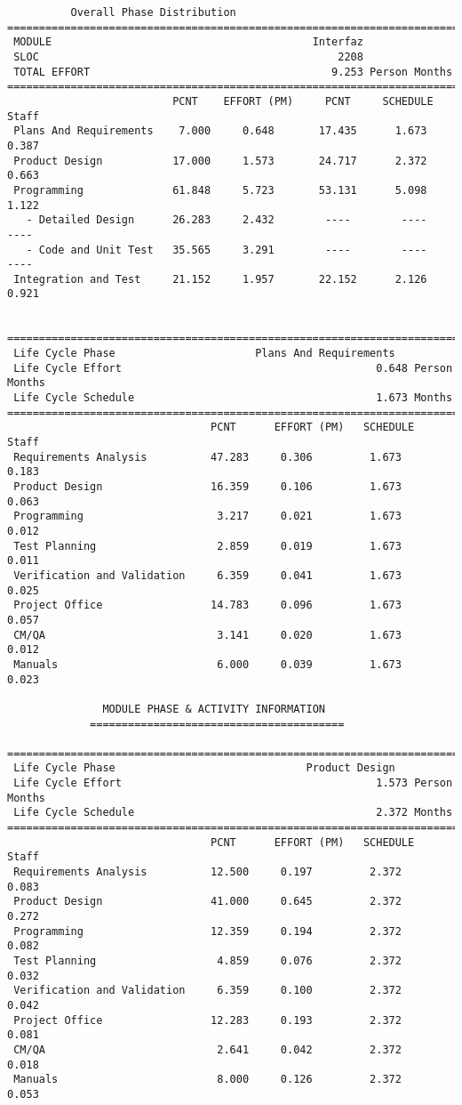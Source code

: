 \documentclass[11pt,a4paper,spanish,twoside]{report}
\begin{document}
{\begin{verbatim}
          Overall Phase Distribution
==============================================================================
 MODULE                                         Interfaz
 SLOC                                               2208
 TOTAL EFFORT                                      9.253 Person Months
==============================================================================
                          PCNT    EFFORT (PM)     PCNT     SCHEDULE       Staff
 Plans And Requirements    7.000     0.648       17.435      1.673       0.387
 Product Design           17.000     1.573       24.717      2.372       0.663
 Programming              61.848     5.723       53.131      5.098       1.122
   - Detailed Design      26.283     2.432        ----        ----        ----
   - Code and Unit Test   35.565     3.291        ----        ----        ----
 Integration and Test     21.152     1.957       22.152      2.126       0.921


==============================================================================
 Life Cycle Phase                      Plans And Requirements
 Life Cycle Effort                                        0.648 Person Months
 Life Cycle Schedule                                      1.673 Months
==============================================================================
                                PCNT      EFFORT (PM)   SCHEDULE       Staff   
 Requirements Analysis          47.283     0.306         1.673        0.183
 Product Design                 16.359     0.106         1.673        0.063
 Programming                     3.217     0.021         1.673        0.012
 Test Planning                   2.859     0.019         1.673        0.011
 Verification and Validation     6.359     0.041         1.673        0.025
 Project Office                 14.783     0.096         1.673        0.057
 CM/QA                           3.141     0.020         1.673        0.012
 Manuals                         6.000     0.039         1.673        0.023

		       MODULE PHASE & ACTIVITY INFORMATION
		     ========================================

==============================================================================
 Life Cycle Phase                              Product Design
 Life Cycle Effort                                        1.573 Person Months
 Life Cycle Schedule                                      2.372 Months
==============================================================================
                                PCNT      EFFORT (PM)   SCHEDULE       Staff   
 Requirements Analysis          12.500     0.197         2.372        0.083
 Product Design                 41.000     0.645         2.372        0.272
 Programming                    12.359     0.194         2.372        0.082
 Test Planning                   4.859     0.076         2.372        0.032
 Verification and Validation     6.359     0.100         2.372        0.042
 Project Office                 12.283     0.193         2.372        0.081
 CM/QA                           2.641     0.042         2.372        0.018
 Manuals                         8.000     0.126         2.372        0.053


\end{verbatim}}
\end{document}
